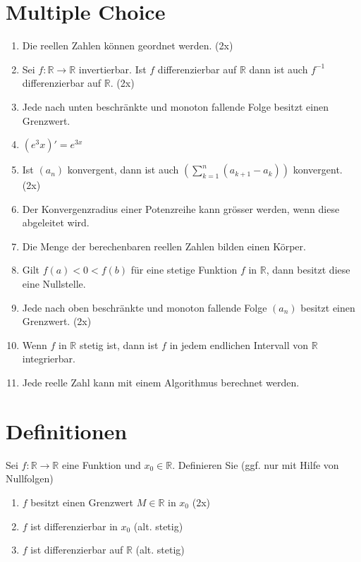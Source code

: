 \documentclass{article}
\begin{document}
\section*{Multiple Choice}

\begin{enumerate}[label=(\arabic*)]
    \item Die reellen Zahlen können geordnet werden. (2x)
    
    \item Sei $f: \mathbb{R} \to \mathbb{R}$ invertierbar. Ist $f$ differenzierbar auf $\mathbb{R}$ dann ist auch $f^{-1}$ differenzierbar auf $\mathbb{R}$. (2x)
    
    \item Jede nach unten beschränkte und monoton fallende Folge besitzt einen Grenzwert.
    
    \item $(e^3x)' = e^{3x}$
    
    \item Ist $(a_n)$ konvergent, dann ist auch $(\sum_{k = 1}^{n}(a_{k + 1} - a_k))$ konvergent. (2x)
    
    \item Der Konvergenzradius einer Potenzreihe kann grösser werden, wenn diese abgeleitet wird.

    \item Die Menge der berechenbaren reellen Zahlen bilden einen Körper.
    
    \item Gilt $f(a) < 0 < f(b)$ für eine stetige Funktion $f$ in $\mathbb{R}$, dann besitzt diese eine Nullstelle.
    
    \item Jede nach oben beschränkte und monoton fallende Folge $(a_n)$ besitzt einen Grenzwert. (2x)
    
    \item Wenn $f$ in $\mathbb{R}$ stetig ist, dann ist $f$ in jedem endlichen Intervall von $\mathbb{R}$ integrierbar.
        
    \item Jede reelle Zahl kann mit einem Algorithmus berechnet werden.
\end{enumerate}

\section*{Definitionen}

Sei $f: \mathbb{R} \to \mathbb{R}$ eine Funktion und $x_0 \in \mathbb{R}$. Definieren Sie (ggf. nur mit Hilfe von Nullfolgen)
\begin{enumerate}
    \item $f$ besitzt einen Grenzwert $M \in \mathbb{R}$ in $x_0$ (2x)
    \item $f$ ist differenzierbar in $x_0$ (alt. stetig)
    \item $f$ ist differenzierbar auf $\mathbb{R}$ (alt. stetig)
\end{enumerate}
\end{document}
